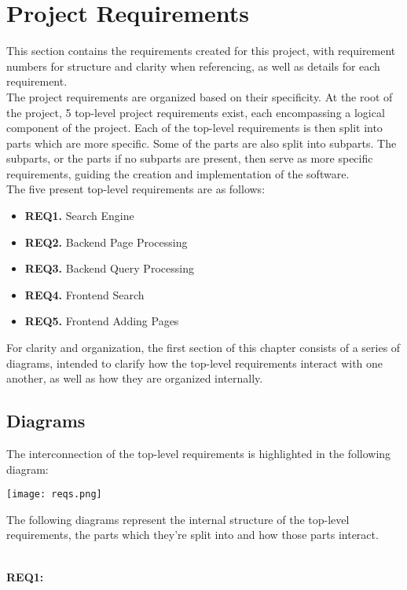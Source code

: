 \section{Project Requirements}

This section contains the requirements created for this project, with requirement numbers for structure and clarity when referencing, as well as details for each requirement.\\

The project requirements are organized based on their specificity. At the root of the project, 5 top-level project requirements exist, each encompassing a logical component of the project.
Each of the top-level requirements is then split into parts which are more specific. Some of the parts are also split into subparts. 
The subparts, or the parts if no subparts are present, then serve as more specific requirements, guiding the creation and implementation of the software.\\

The five present top-level requirements are as follows:
\begin{itemize}
    \item \textbf{REQ1.} Search Engine
    \item \textbf{REQ2.} Backend Page Processing
    \item \textbf{REQ3.} Backend Query Processing
    \item \textbf{REQ4.} Frontend Search
    \item \textbf{REQ5.} Frontend Adding Pages
\end{itemize}

For clarity and organization, the first section of this chapter consists of a series of diagrams, intended to clarify how the top-level requirements interact with one another,
as well as how they are organized internally.

\subsection{Diagrams}

The interconnection of the top-level requirements is highlighted in the following diagram:

\texttt{[image: reqs.png]}

The following diagrams represent the internal structure of the top-level requirements, the parts which they're split into and how those parts interact.

\textbf{\\REQ1:}


